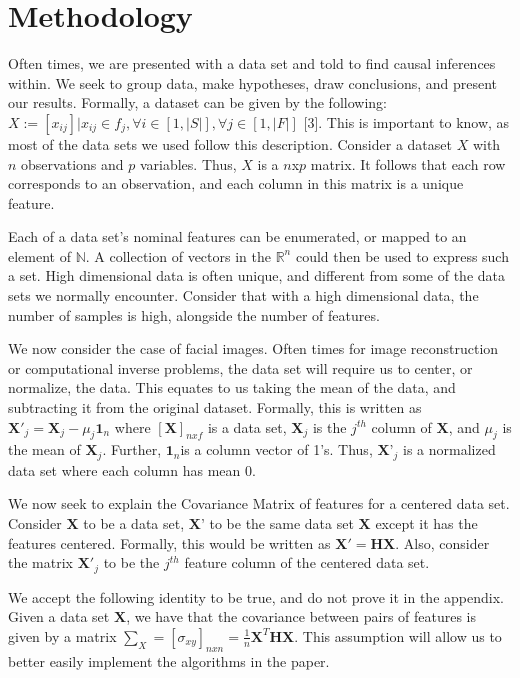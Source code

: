\section{Methodology} \label{sec:methodology}

\hspace{5mm}Often times, we are presented with a data set and told to find causal inferences within. We seek to group data, make hypotheses, draw conclusions, and present our results. Formally, a dataset can be given by the following: $X:=[x_{ij}]|x_{ij}\in f_j,\forall i\in[1,|S|],\forall j\in[1,|F|]$ [3]. This is important to know, as most of the data sets we used follow this description. Consider a dataset $X$ with $n$ observations and $p$ variables. Thus, $X$ is a $n$x$p$ matrix. It follows that each row corresponds to an observation, and each column in this matrix is a unique feature. 

Each of a data set's nominal features can be enumerated, or mapped to an element of $\mathbb{N}$. A collection of vectors in the $\mathbb{R}^n$ could then be used to express such a set. High dimensional data is often unique, and different from some of the data sets we normally encounter. Consider that with a high dimensional data, the number of samples is high, alongside the number of features.

We now consider the case of facial images. Often times for image reconstruction or computational inverse problems, the data set will require us to center, or normalize, the data. This equates to us taking the mean of the data, and subtracting it from the original dataset. Formally, this is written as $\textbf{X}'_j=\textbf{X}_j-\mu_j\textbf{1}_n$ where $[\textbf{X}]_{n x f}$ is a data set, $\textbf{X}_j$ is the $j^{th}$ column of $\textbf{X}$, and $\mu_j$ is the mean of $\textbf{X}_j$. Further, $\textbf{1}_n$is a column vector of 1's. Thus, $\textbf{X'}_j$ is a normalized data set where each column has mean 0.


We now seek to explain the Covariance Matrix of features for a centered data set. Consider $\textbf{X}$ to be a data set, $\textbf{X'}$ to be the same data set $\textbf{X}$ except it has the features centered. Formally, this would be written as $\textbf{X}'=\textbf{HX}$. Also, consider the matrix $\textbf{X}'_j$ to be the $j^{th}$ feature column of the centered data set.

We accept the following identity to be true, and do not prove it in the appendix. Given a data set $\textbf{X}$, we have that the covariance between pairs of features is given by a matrix $\sum_X=[\sigma_{xy}]_{nxn}=\frac{1}{n}\textbf{X}^T\textbf{HX}$. This assumption will allow us to better easily implement the algorithms in the paper. 

